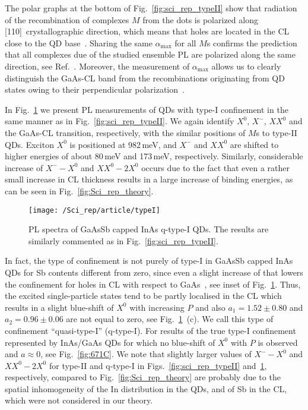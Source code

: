 The polar graphs at the bottom of Fig.~\ref{fig:sci_rep_typeII} show that radiation of the recombination of complexes $M$ from the dots is polarized along [110]~crystallographic direction, which means that holes are located in the CL close to the QD base~\citep{Klenovsky2015}. Sharing the same $\alpha_\mathrm{max}$ for all $M$s confirms the prediction that all complexes due of the studied ensemble PL are polarized along the same direction, see Ref.~\citep{Klenovsky2017}. Moreover, the measurement of $\alpha_\mathrm{max}$ allows us to clearly distinguish the GaAs-CL band from the recombinations originating from QD states owing to their perpendicular polarization~\citep{Alonso-Alvarez2011a}.

In Fig.~\ref{fig:scirep_typeIq} we present PL measurements of QDs with type-I confinement in the same manner as in Fig.~\ref{fig:sci_rep_typeII}. We again identify $X^0$, $X^-$, $XX^0$ and the GaAs-CL transition, respectively, with the similar positions of $M$s to type-II QDs. Exciton $X^0$ is positioned at 982$\,$meV, and $X^-$ and $XX^0$ are shifted to higher energies of about 80$\,$meV and 173$\,$meV, respectively. Similarly, considerable increase of $X^--X^0$ and $XX^0-2X^0$ occurs due to the fact that even a rather small increase in CL thickness results in a large increase of binding energies, as can be seen in Fig.~\ref{fig:Sci_rep_theory}. 
%
\begin{figure}
	\centering
	\texttt{[image: /Sci\_rep/article/typeI]}
	\caption{PL spectra of GaAsSb capped InAs q-type-I QDs. The results are similarly commented as in Fig.~\ref{fig:sci_rep_typeII}.}
	\label{fig:scirep_typeIq}
\end{figure}
%
In fact, the type of confinement is not purely of type-I in GaAsSb capped InAs QDs for Sb contents different from zero, since even a slight increase of that lowers the confinement for holes in CL with respect to GaAs~\cite{Klenovsky10}, see inset of Fig.~\ref{fig:scirep_typeIq}. Thus, the excited single-particle states tend to be partly localised in the CL which results in a slight blue-shift of $X^0$ with increasing $P$ and also $a_1=1.52\pm0.80$ and $a_2=0.96\pm0.06$ are not equal to zero, see Fig.~\ref{fig:scirep_typeIq}~(c). We call this type of confinement \enquote{quasi-type-I} (q-type-I). For results of the true type-I confinement represented by InAs/GaAs QDs for which no blue-shift of $X^0$ with $P$ is observed and $a\approx0$, see Fig.~\ref{fig:671C}. We note that slightly larger values of $X^--X^0$ and $XX^0-2X^0$ for type-II and q-type-I in Figs.~\ref{fig:sci_rep_typeII} and~\ref{fig:scirep_typeIq}, respectively, compared to Fig.~\ref{fig:Sci_rep_theory} are probably due to the spatial inhomogeneity of the In distribution in the QDs, and of Sb in the CL, which were not considered in our theory. 

